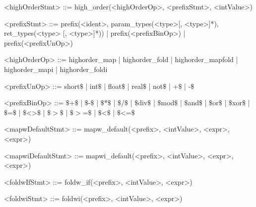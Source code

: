 \documentclass{article}
\begin{document}
\begin{grammar}
<highOrderStmt> ::= high_order(<highOrderOp>, <prefixStmt>, <intValue>)

<prefixStmt> ::= prefix(<ident>, param_types(<type>[, <type>]*), ret_types(<type> [, <type>]*)) |
                 prefix(<prefixBinOp>) | prefix(<prefixUnOp>)


<highOrderOp> ::= highorder_map | highorder_fold | highorder_mapfold |
                  highorder_mapi | highorder_foldi

<prefixUnOp> ::= short\(\$\) | int\(\$\) | float\(\$\) | real\(\$\) | not\(\$\) | +\(\$\) | -\(\$\)

<prefixBinOp> ::= \(\$\)+\(\$\) | \(\$\)-\(\$\) | \(\$\)*\(\$\) | \(\$\)/\(\$\) |
                  \(\$\)div\(\$\) | \(\$\)mod\(\$\) | \(\$\)and\(\$\) | \(\$\)or\(\$\) | \(\$\)xor\(\$\) |
                  \(\$\)=\(\$\) | \(\$\)<>\(\$\) | \(\$\)\(>\)\(\$\) | \(\$\)\(>\)=\(\$\) | \(\$\)\textless\(\$\) | \(\$\)\textless=\(\$\)

<mapwDefaultStmt> ::= mapw_default(<prefix>, <intValue>, <expr>, <expr>)

<mapwiDefaultStmt> ::= mapwi_default(<prefix>, <intValue>, <expr>, <expr>)

<foldwIfStmt> ::= foldw_if(<prefix>, <intValue>, <expr>)

<foldwiStmt> ::= foldwi(<prefix>, <intValue>, <expr>)

\end{grammar}
\end{document}
